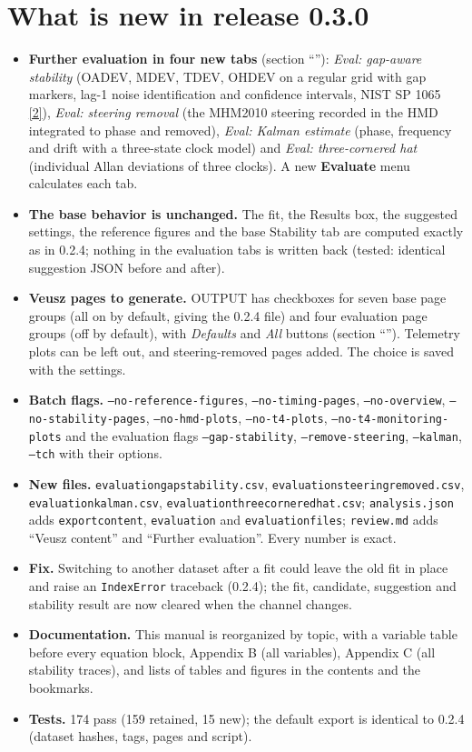\documentclass[11pt,a4paper]{article}
\newcommand{\nist}{\href{https://tf.nist.gov/general/pdf/2220.pdf}{[2]}}
\renewcommand{\_}{\usscore\allowbreak}
\begin{document}
\section{What is new in release 0.3.0}
\begin{itemize}
\item \textbf{Further evaluation in four new tabs} (section ``''):
\emph{Eval: gap-aware stability} (OADEV, MDEV, TDEV, OHDEV on a regular grid with gap markers,
lag-1 noise identification and confidence intervals, NIST SP 1065 \nist), \emph{Eval: steering
removal} (the MHM2010 steering recorded in the HMD integrated to phase and removed),
\emph{Eval: Kalman estimate} (phase, frequency and drift with a three-state clock model) and
\emph{Eval: three-cornered hat} (individual Allan deviations of three clocks). A new
\textbf{Evaluate} menu calculates each tab.
\item \textbf{The base behavior is unchanged.} The fit, the Results box, the suggested settings,
the reference figures and the base Stability tab are computed exactly as in 0.2.4; nothing in
the evaluation tabs is written back (tested: identical suggestion JSON before and after).
\item \textbf{Veusz pages to generate.} OUTPUT has checkboxes for seven base page groups (all on by
default, giving the 0.2.4 file) and four evaluation page groups (off by default), with
\emph{Defaults} and \emph{All} buttons (section ``''). Telemetry plots can be
left out, and steering-removed pages added. The choice is saved with the settings.
\item \textbf{Batch flags.} \texttt{--no-reference-figures}, \texttt{--no-timing-pages},
\texttt{--no-overview}, \texttt{--no-stability-pages}, \texttt{--no-hmd-plots},
\texttt{--no-t4-plots}, \texttt{--no-t4-monitoring-plots} and the evaluation flags
\texttt{--gap-stability}, \texttt{--remove-steering}, \texttt{--kalman}, \texttt{--tch}
with their options.
\item \textbf{New files.} \texttt{evaluation\_gap\_stability.csv},
\texttt{evaluation\_steering\_removed.csv}, \texttt{evaluation\_kalman.csv},
\texttt{evaluation\_three\_cornered\_hat.csv}; \texttt{analysis.json} adds
\texttt{export\_content}, \texttt{evaluation} and \texttt{evaluation\_files}; \texttt{review.md}
adds ``Veusz content'' and ``Further evaluation''. Every number is exact.
\item \textbf{Fix.} Switching to another dataset after a fit could leave the old fit in place and
raise an \texttt{IndexError} traceback (0.2.4); the fit, candidate, suggestion and stability
result are now cleared when the channel changes.
\item \textbf{Documentation.} This manual is reorganized by topic, with a variable table
before every equation block, Appendix B (all variables), Appendix C (all stability traces), and
lists of tables and figures in the contents and the bookmarks.
\item \textbf{Tests.} 174 pass (159 retained, 15 new); the default export is identical to 0.2.4
(dataset hashes, tags, pages and script).
\end{itemize}
\end{document}

